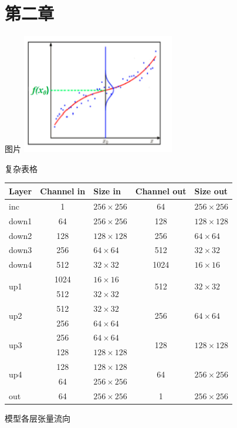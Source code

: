 \documentclass{beamer}
\begin{document}
\section{第二章}
\begin{frame}{图片}
    \centering
    \includegraphics[width=0.5\textwidth]{assets/example/6.2.1.png}
\end{frame}

\begin{frame}{复杂表格}
    \begin{table}[htb]
        \centering
        \small
        \begin{tabular}{p{2.5cm}c{4cm}p{4cm}c{4cm}p{3.5cm}}
            \toprule
            \textbf{Layer} & \textbf{Channel in} & \textbf{Size in} & \textbf{Channel out} & \textbf{Size out}\\
            \midrule
            inc & 1 & $256\times256$ & 64 & $256\times256$\\
            \midrule
            down1 & 64 & $256\times256$ & 128 & $128\times128$\\
            down2 & 128 & $128\times128$ & 256 & $64\times64$\\
            down3 & 256 & $64\times64$ & 512 & $32\times32$\\
            down4 & 512 & $32\times32$ & 1024 & $16\times16$\\
            \midrule
            \multirow{2}{*}{up1} & 1024 & $16\times16$ & \multirow{2}{*}{512} & \multirow{2}{*}{$32\times32$}\\
             & 512 & $32\times32$ &  & \\
            \midrule
            \multirow{2}{*}{up2} & 512 & $32\times32$ & \multirow{2}{*}{256} & \multirow{2}{*}{$64\times64$}\\
             & 256 & $64\times64$ &  & \\
            \midrule
            \multirow{2}{*}{up3} & 256 & $64\times64$ & \multirow{2}{*}{128} & \multirow{2}{*}{$128\times128$}\\
             & 128 & $128\times128$ &  & \\
            \midrule
            \multirow{2}{*}{up4} & 128 & $128\times128$ & \multirow{2}{*}{64} & \multirow{2}{*}{$256\times256$}\\
             & 64 & $256\times256$ &  & \\
            \midrule
            out & 64 & $256\times256$ & 1 & $256\times256$\\
            \bottomrule
        \end{tabular}
    \end{table}
    \centering
    \small
    模型各层张量流向
\end{frame}
\end{document}
